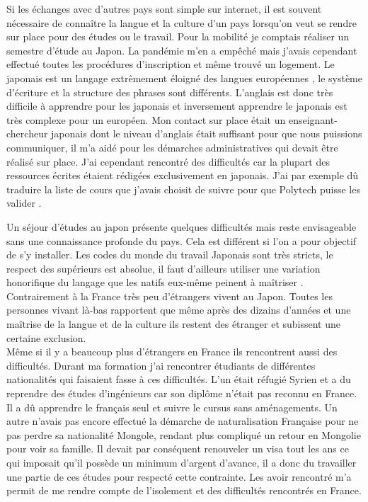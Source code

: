 \documentclass[french,a4paper,12pt]{report}
\begin{document}
Si les échanges avec d'autres pays sont simple sur internet, il est souvent nécessaire de connaître la langue et la culture d'un pays lorsqu'on veut se rendre sur place pour des études ou le travail. Pour la mobilité je comptais réaliser un semestre d'étude au Japon. La pandémie m’en a empêché mais j’avais cependant effectué toutes les procédures d’inscription et même trouvé un logement. Le japonais est un langage extrêmement éloigné des langues européennes , le système d’écriture et la structure des phrases sont différents. L’anglais est donc très difficile à apprendre pour les japonais et inversement apprendre le japonais est très complexe pour un européen. Mon contact sur place était un enseignant-chercheur japonais dont le niveau d’anglais était suffisant pour que nous puissions communiquer, il m’a aidé pour les démarches administratives qui devait être réalisé sur place. J’ai cependant rencontré des difficultés car la plupart des ressources écrites étaient rédigées exclusivement en japonais. J’ai par exemple dû traduire la liste de cours que j’avais choisit de suivre pour que Polytech puisse les valider .

Un séjour d'études au japon présente quelques difficultés mais reste envisageable sans une connaissance profonde du pays. Cela est différent si l'on a pour objectif de s'y installer.
Les codes du monde du travail Japonais sont très stricts, le respect des supérieurs est absolue, il faut d'ailleurs utiliser une variation honorifique du langage que les natifs eux-même peinent à maîtriser .
Contrairement à la France très peu d'étrangers vivent au Japon. Toutes les personnes vivant là-bas rapportent que même après des dizains d’années et une maîtrise de la langue et de la culture ils restent des étranger et subissent une certaine exclusion.\\

Même si il y a beaucoup plus d'étrangers en France ils rencontrent aussi des difficultés. Durant ma formation j'ai rencontrer étudiants de différentes nationalités qui faisaient fasse à ces difficultés. L'un était réfugié Syrien et a du reprendre des études d'ingénieurs car son diplôme n'était pas reconnu en France. Il a dû apprendre le français seul et suivre le cursus sans aménagements.
Un autre n'avais pas encore effectué la démarche de naturalisation Française pour ne pas perdre sa nationalité Mongole, rendant plus compliqué un retour en Mongolie pour voir sa famille. Il devait par conséquent renouveler un visa tout les ans ce qui imposait qu'il possède un minimum d'argent d'avance, il a donc du travailler une partie de ces études pour respecté cette contrainte.
Les avoir rencontré m'a permit de me rendre compte de l'isolement et des difficultés rencontrés en France.\\
\end{document}
